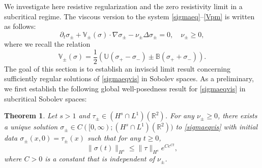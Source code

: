 \documentclass[11pt,reqno]{amsproc}
\newcommand{\pa}{\partial}
\newcommand{\fr}{\frac}
\newcommand{\na}{\nabla}
\newtheorem{thm}{Theorem}
\newcommand{\R}{\mathbb{R}}
\begin{document}
 We investigate here resistive regularization and the zero resistivity limit in a subcritical regime. 
  The viscous version to the system \eqref{sigmaeq}--\eqref{Vpm} is written as follows:
 \begin{equation}
     \label{sigmaeqvis}
     \pa_t \sigma_{\pm} + \mathbb V_{\pm}(\sigma)\cdot\na \sigma_{\pm} - \nu_\pm \Delta \sigma_\pm=0, \quad \nu_\pm \ge 0,
 \end{equation}
 where we recall the relation
 $$
 \mathbb V_{\pm}(\sigma) = \fr{1}{2}\left (\mathbb U (\sigma_{+}-\sigma_{-}) \pm \mathbb B(\sigma_+ +\sigma_-)\right ).
 $$
The goal of this section is to establish an inviscid limit result concerning sufficiently regular solutions of \eqref{sigmaeqvis} in Sobolev spaces. As a preliminary, we first establish the following global well-posedness result for \eqref{sigmaeqvis} in subcritical Sobolev spaces:
\begin{thm}
    Let $s > 1$ and $\tau_\pm \in (H^s \cap L^1)(\R^2)$. For any $\nu_\pm \ge 0$, there exists a unique solution $\sigma_\pm \in C([0,\infty); (H^s \cap L^1)(\R^2))$ to \eqref{sigmaeqvis} with initial data $\sigma_\pm(x,0) = \tau_\pm(x)$ such that for any $t \ge 0$,
    \begin{equation}
        \label{est:visenergy}
        \|\sigma(t)\|_{H^s} \le \|\tau\|_{H^s} e^{Ce^{Ct}},
    \end{equation}
    where $C > 0$ is a constant that is independent of $\nu_\pm$.
\end{thm}
\end{document}
